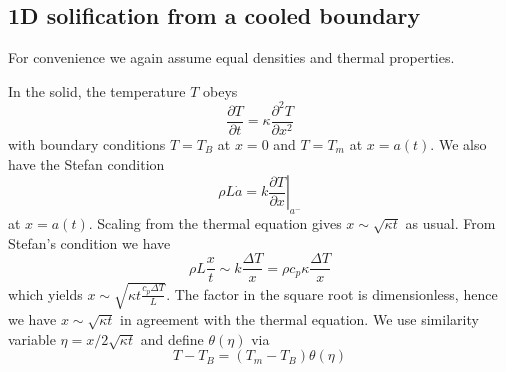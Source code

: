 \documentclass{jknotes}
\begin{document}
\subsection{1D solification from a cooled boundary}
For convenience we again assume equal densities and thermal properties. 
\begin{center}
\end{center}

In the solid, the temperature $T$ obeys
\begin{equation}
	\frac{\partial T}{\partial t} = \kappa \frac{\partial^2 T}{\partial x^2}
\end{equation}
with boundary conditions $T = T_B$ at $x=0$ and $T = T_m$ at $x= a(t)$. We
also have the Stefan condition
\begin{equation}
	\rho L \dot{a} = k \left.\frac{\partial T}{\partial x} \right|_{a^-}
\end{equation}
at $x = a(t)$.  Scaling from the thermal equation gives $x \sim \sqrt{\kappa
t}$ as usual.  From Stefan's condition we have
\begin{equation}
	\rho L \frac{x}{t} \sim k \frac{\Delta T}{x} = \rho c_p \kappa
	\frac{\Delta T}{x}
\end{equation}
which yields $x \sim \sqrt{\kappa t \frac{c_p \Delta T}{L}}$. The factor in
the square root is dimensionless, hence we have $x \sim \sqrt{\kappa t}$ in
agreement with the thermal equation. We use similarity variable $\eta = x /
2\sqrt{\kappa t}$ and define $\theta(\eta)$ via
\begin{equation}
	T - T_B = (T_m - T_B) \theta(\eta)
\end{equation}
\end{document}
